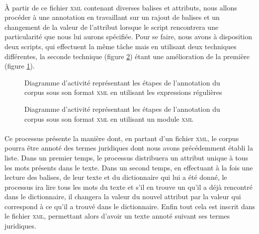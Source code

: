 \paragraph{}À partir de ce fichier \textsc{xml} contenant diverses balises et attributs, nous allons procéder à une annotation en travaillant sur un rajout de balises et un changement de la valeur de l'attribut lorsque le script rencontrera une particularité que nous lui aurons spécifiée. Pour se faire, nous avons à disposition deux scripts, qui effectuent la même tâche mais en utilisant deux techniques différentes, la seconde technique (figure \ref{fig:annotation_xml}) étant une amélioration de la première (figure \ref{fig:annotation_txm}).
\begin{figure}[p]
    \centering
    \caption{Diagramme d'activité représentant les étapes de l'annotation du corpus sous son format \textsc{xml} en utilisant les expressions régulières}
    \label{fig:annotation_txm}
\end{figure}
\begin{figure}[p]
    \centering
    \caption{Diagramme d'activité représentant les étapes de l'annotation du corpus sous son format \textsc{xml} en utilisant un module \textsc{xml}}
    \label{fig:annotation_xml}
\end{figure}
\paragraph{} Ce processus présente la manière dont, en partant d'un fichier \textsc{xml}, le corpus pourra être annoté des termes juridiques dont nous avons précédemment établi la liste. Dans un premier temps, le processus distribuera un attribut unique à tous les mots présents dans le texte. Dans un second temps, en effectuant à la fois une lecture des balises, de leur texte et du dictionnaire qui lui a été donné, le processus ira lire tous les mots du texte et s'il en trouve un qu'il a déjà rencontré dans le dictionnaire, il changera la valeur du nouvel attribut par la valeur qui correspond à ce qu'il a trouvé dans le dictionnaire. Enfin tout cela est inscrit dans le fichier \textsc{xml}, permettant alors d'avoir un texte annoté suivant ses termes juridiques.

